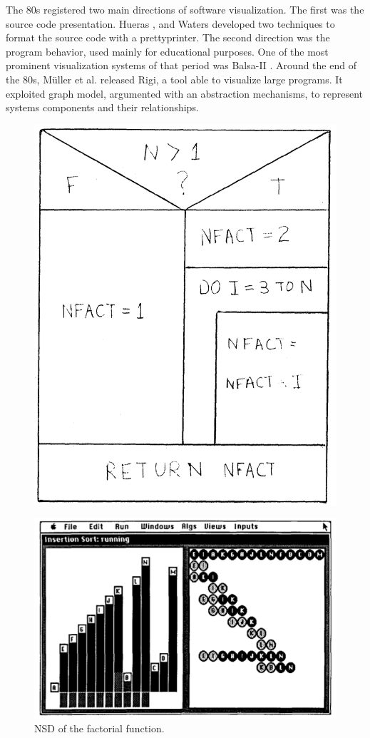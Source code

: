 The 80s registered two main directions of software visualization. The first was the source code presentation.
Hueras \cite{Hueras1977}, and Waters \cite{Waters1983} developed two techniques to format the source code with a prettyprinter. 
The second direction was the program behavior, used mainly for educational purposes. One of the most prominent visualization systems of that period was Balsa-II \cite{Brown1988}.
Around the end of the 80s, Müller et al. \cite{Mueller1988} released Rigi, a tool able to visualize large programs.
It exploited graph model, argumented with an abstraction mechanisms, to represent systems components and their relationships. 

\begin{figure}[H]
    \includegraphics[width=0.8\linewidth]{Nassi1973_NSD.png}
    \label{fig:Nassi1973_NSD}
    \caption{NSD of the factorial function.}
  \endminipage\hfill
    \includegraphics[width=\linewidth]{Brown1988_BalsaII.png}

\end{figure}
